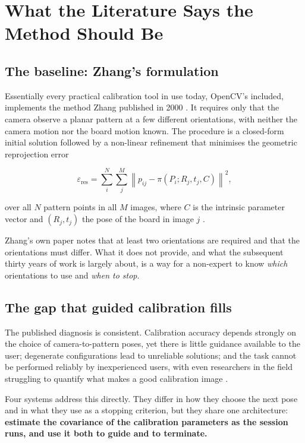 \chapter{What the Literature Says the Method Should Be}
\label{chap:literature}

\section{The baseline: Zhang's formulation}

Essentially every practical calibration tool in use today, OpenCV's included, implements the method Zhang published in 2000 \cite{zhang2000flexible}. It requires only that the camera observe a planar pattern at a few different orientations, with neither the camera motion nor the board motion known. The procedure is a closed-form initial solution followed by a non-linear refinement that minimises the geometric reprojection error

\begin{equation}
\varepsilon_{\mathrm{res}} = \sum_{i}^{N}\sum_{j}^{M} \left\lVert p_{ij} - \pi(P_i; R_j, t_j, C) \right\rVert^2 ,
\label{eq:reprojection}
\end{equation}

over all $N$ pattern points in all $M$ images, where $C$ is the intrinsic parameter vector and $(R_j, t_j)$ the pose of the board in image $j$ \cite{rojtberg2018pose,zhang2000flexible}.

Zhang's own paper notes that at least two orientations are required and that the orientations must differ. What it does not provide, and what the subsequent thirty years of work is largely about, is a way for a non-expert to know \emph{which} orientations to use and \emph{when to stop}.

\section{The gap that guided calibration fills}

The published diagnosis is consistent. Calibration accuracy depends strongly on the choice of camera-to-pattern poses, yet there is little guidance available to the user; degenerate configurations lead to unreliable solutions; and the task cannot be performed reliably by inexperienced users, with even researchers in the field struggling to quantify what makes a good calibration image \cite{rojtberg2018pose,peng2019wizard,richardson2013aprilcal}.

Four systems address this directly. They differ in how they choose the next pose and in what they use as a stopping criterion, but they share one architecture: \textbf{estimate the covariance of the calibration parameters as the session runs, and use it both to guide and to terminate.}

